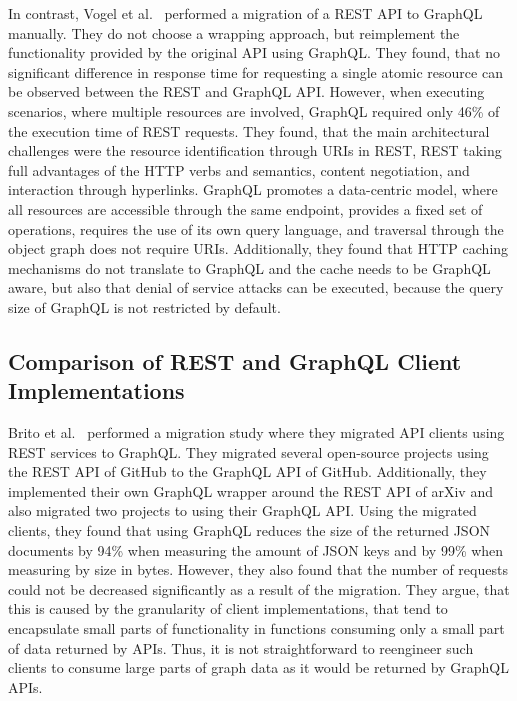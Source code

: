 In contrast, Vogel et al.~\cite{Vogel2017} performed a migration of a \ac{REST} \ac{API} to GraphQL manually.
They do not choose a wrapping approach, but reimplement the functionality provided by the original \ac{API} using GraphQL.
They found, that no significant difference in response time for requesting a single atomic resource can be observed between the \ac{REST} and GraphQL \ac{API}.
However, when executing scenarios, where multiple resources are involved, GraphQL required only 46\% of the execution time of \ac{REST} requests.
They found, that the main architectural challenges were the resource identification through \acp{URI} in \ac{REST}, \ac{REST} taking full advantages of the \ac{HTTP} verbs and semantics, content negotiation, and interaction through hyperlinks.
GraphQL promotes a data-centric model, where all resources are accessible through the same endpoint, provides a fixed set of operations, requires the use of its own query language, and traversal through the object graph does not require \acp{URI}.
Additionally, they found that \ac{HTTP} caching mechanisms do not translate to GraphQL and the cache needs to be GraphQL aware, but also that denial of service attacks can be executed, because the query size of GraphQL is not restricted by default.

\subsection{Comparison of \acs{REST} and GraphQL Client Implementations}\label{sec:rel-3}

Brito et al.~\cite{Brito2019} performed a migration study where they migrated \ac{API} clients using \ac{REST} services to GraphQL.
They migrated several open-source projects using the \ac{REST} \ac{API} of GitHub to the GraphQL \ac{API} of GitHub.
Additionally, they implemented their own GraphQL wrapper around the \ac{REST} \ac{API} of arXiv and also migrated two projects to using their GraphQL \ac{API}.
Using the migrated clients, they found that using GraphQL reduces the size of the returned \ac{JSON} documents by 94\% when measuring the amount of \ac{JSON} keys and by 99\% when measuring by size in bytes.
However, they also found that the number of requests could not be decreased significantly as a result of the migration.
They argue, that this is caused by the granularity of client implementations, that tend to encapsulate small parts of functionality in functions consuming only a small part of data returned by \acp{API}.
Thus, it is not straightforward to reengineer such clients to consume large parts of graph data as it would be returned by GraphQL \acp{API}.

